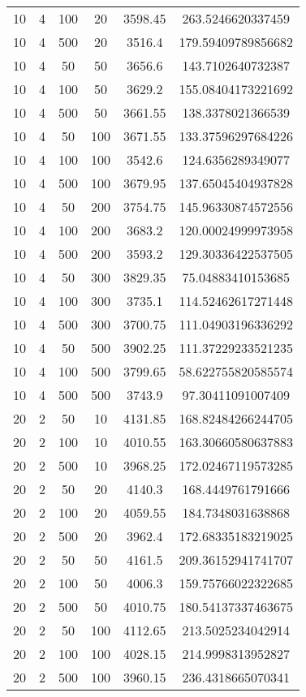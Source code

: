 {\begin{longtabu}{S
S
S
S
S[round-mode=places, round-precision=0]
S[round-mode=places, round-precision=0]}
10 & 4 & 100 & 20 & 3598.45 & 263.5246620337459 \\
10 & 4 & 500 & 20 & 3516.4 & 179.59409789856682 \\
10 & 4 & 50 & 50 & 3656.6 & 143.7102640732387 \\
10 & 4 & 100 & 50 & 3629.2 & 155.08404173221692 \\
10 & 4 & 500 & 50 & 3661.55 & 138.3378021366539 \\
10 & 4 & 50 & 100 & 3671.55 & 133.37596297684226 \\
10 & 4 & 100 & 100 & 3542.6 & 124.6356289349077 \\
10 & 4 & 500 & 100 & 3679.95 & 137.65045404937828 \\
10 & 4 & 50 & 200 & 3754.75 & 145.96330874572556 \\
10 & 4 & 100 & 200 & 3683.2 & 120.00024999973958 \\
10 & 4 & 500 & 200 & 3593.2 & 129.30336422537505 \\
10 & 4 & 50 & 300 & 3829.35 & 75.04883410153685 \\
10 & 4 & 100 & 300 & 3735.1 & 114.52462617271448 \\
10 & 4 & 500 & 300 & 3700.75 & 111.04903196336292 \\
10 & 4 & 50 & 500 & 3902.25 & 111.37229233521235 \\
10 & 4 & 100 & 500 & 3799.65 & 58.622755820585574 \\
10 & 4 & 500 & 500 & 3743.9 & 97.30411091007409 \\
20 & 2 & 50 & 10 & 4131.85 & 168.82484266244705 \\
20 & 2 & 100 & 10 & 4010.55 & 163.30660580637883 \\
20 & 2 & 500 & 10 & 3968.25 & 172.02467119573285 \\
20 & 2 & 50 & 20 & 4140.3 & 168.4449761791666 \\
20 & 2 & 100 & 20 & 4059.55 & 184.7348031638868 \\
20 & 2 & 500 & 20 & 3962.4 & 172.68335183219025 \\
20 & 2 & 50 & 50 & 4161.5 & 209.36152941741707 \\
20 & 2 & 100 & 50 & 4006.3 & 159.75766022322685 \\
20 & 2 & 500 & 50 & 4010.75 & 180.54137337463675 \\
20 & 2 & 50 & 100 & 4112.65 & 213.5025234042914 \\
20 & 2 & 100 & 100 & 4028.15 & 214.9998313952827 \\
20 & 2 & 500 & 100 & 3960.15 & 236.4318665070341 \\

\end{longtabu}}
